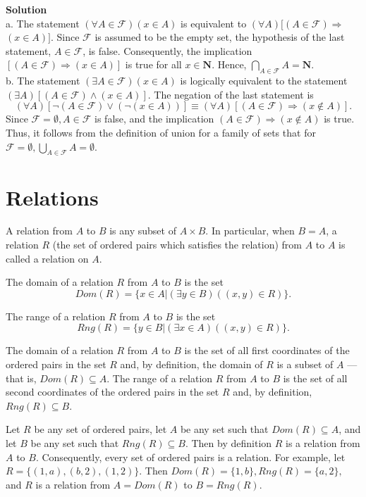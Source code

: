 \documentclass{article}
\begin{document}
    \textbf{Solution} \\
    a. The statement $(\forall A \in \mathcal{F})(x \in A)$ is equivalent to $(\forall A)[(A \in \mathcal{F}) \Rightarrow$ $(x \in A)]$. Since $\mathcal{F}$ is assumed to be the empty set, the hypothesis of the last statement, $A \in \mathcal{F}$, is false. Consequently, the implication $[(A \in \mathcal{F}) \Rightarrow(x \in A)]$ is true for all $x \in \mathbf{N}$. Hence, $\bigcap_{A \in \mathcal{F}} A=\mathbf{N}$. \\
    b. The statement $(\exists A \in \mathcal{F})(x \in A)$ is logically equivalent to the statement $(\exists A)[(A \in \mathcal{F}) \wedge(x \in A)]$. The negation of the last statement is
    $$
    (\forall A)[\neg(A \in \mathcal{F}) \vee(\neg(x \in A))] \equiv(\forall A)[(A \in \mathcal{F}) \Rightarrow(x \notin A)] .
    $$
    Since $\mathcal{F}=\emptyset, A \in \mathcal{F}$ is false, and the implication $(A \in \mathcal{F}) \Rightarrow(x \notin A)$ is true. Thus, it follows from the definition of union for a family of sets that for $\mathcal{F}=\emptyset, \bigcup_{A \in \mathcal{F}} A=\emptyset$.

    \section{Relations}

    A relation from $A$ to $B$ is any subset of $A \times B$. In particular, when $B = A$, a relation $R$ (the set of ordered pairs which satisfies the relation) from $A$ to $A$ is called a relation on $A$.

    The domain of a relation $R$ from $A$ to $B$ is the set 
    $$
    Dom(R) = \{x \in A | (\exists y \in B)((x,y) \in R)\}. 
    $$ 

    The range of a relation $R$ from $A$ to $B$ is the set
    $$
    Rng(R) = \{y \in B | (\exists x \in A)((x,y) \in R)\}.
    $$

    The domain of a relation $R$ from $A$ to $B$ is the set of all first coordinates of the ordered pairs in the set $R$ and, by definition, the domain of $R$ is a subset of $A$ --- that is, $Dom(R) \subseteq A$. The range of a relation $R$ from $A$ to $B$  is the set of all second coordinates of the ordered pairs in the set $R$ and, by definition, $Rng(R) \subseteq B$.

    Let $R$ be any set of ordered pairs, let $A$ be any set such that $Dom(R) \subseteq A$, and let $B$ be any set such that $Rng(R) \subseteq B$. Then by definition $R$ is a relation from $A$ to $B$. Consequently, every set of ordered pairs is a relation. For example, let $R = \{(1,a),(b,2),(1,2)\}$. Then $Dom(R) = \{1,b\},Rng(R) = \{a,2\},$ and $R$ is a relation from $A = Dom(R)$ to $B = Rng(R)$.
\end{document}
